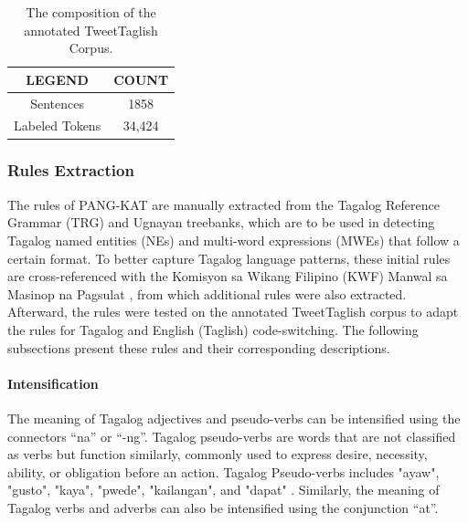 \documentclass[journal]{./IEEE/IEEEtran}
\begin{document}
\begin{table}[H]
    \centering %
    \captionsetup{justification=centering}
    \caption{The composition of the annotated TweetTaglish Corpus.}  \label{tab:effects}
    \vspace{1mm} %

    \renewcommand{\arraystretch}{1.5}
    \fontsize{11pt}{11pt}\selectfont
    \begin{tabular}{|c|c|}
    \hline
    \textbf{LEGEND} & \textbf{COUNT} \\ \hline
    Sentences       & 1858           \\ \hline
    Labeled Tokens  & 34,424         \\ \hline
    \end{tabular}
\end{table}

\subsubsection{Rules Extraction}

The rules of PANG-KAT are manually extracted from the Tagalog Reference Grammar (TRG) {\cite{TRG}} and Ugnayan {\cite{Ugnayan}} treebanks, which are to be used in detecting Tagalog named entities (NEs) and multi-word expressions (MWEs) that follow a certain format. To better capture Tagalog language patterns, these initial rules are cross-referenced with the Komisyon sa Wikang Filipino (KWF) Manwal sa Masinop na Pagsulat {\cite{KWFManwal}}, from which additional rules were also extracted. Afterward, the rules were tested on the annotated TweetTaglish corpus to adapt the rules for Tagalog and English (Taglish) code-switching. The following subsections present these rules and their corresponding descriptions. \\

\paragraph{Intensification}

The meaning of Tagalog adjectives and pseudo-verbs can be intensified using the connectors “na” or “-ng”. Tagalog pseudo-verbs are words that are not classified as verbs but function similarly, commonly used to express desire, necessity, ability, or obligation before an action. Tagalog Pseudo-verbs includes "ayaw", "gusto", "kaya", "pwede", "kailangan", and "dapat" {\cite{LearningTagalog}}. Similarly, the meaning of Tagalog verbs and adverbs can also be intensified using the conjunction “at”. \\ \\
\end{document}
